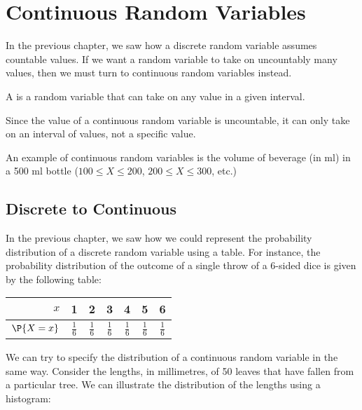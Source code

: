 \chapter{Continuous Random Variables}\label{chap:Continuous-Random-Variables}

In the previous chapter, we saw how a discrete random variable assumes countable values. If we want a random variable to take on uncountably many values, then we must turn to continuous random variables instead.

\begin{definition}\label{def:CRV}
    A  is a random variable that can take on any value in a given interval.
\end{definition}

Since the value of a continuous random variable is uncountable, it can only take on an interval of values, not a specific value.

An example of continuous random variables is the volume of beverage (in ml) in a 500 ml bottle ($100 \leq X \leq 200$, $200 \leq X \leq 300$, etc.)

\section{Discrete to Continuous}

In the previous chapter, we saw how we could represent the probability distribution of a discrete random variable using a table. For instance, the probability distribution of the outcome of a single throw of a 6-sided dice is given by the following table:

\begin{center}
    \begin{tabular}{|r|c|c|c|c|c|c|}
        \hline
        $x$ & 1 & 2 & 3 & 4 & 5 & 6 \\ \hline
        $\P{X = x}$ & $\frac16$ & $\frac16$ & $\frac16$ & $\frac16$ & $\frac16$ & $\frac16$ \\ \hline
    \end{tabular}
\end{center}

We can try to specify the distribution of a continuous random variable in the same way. Consider the lengths, in millimetres, of 50 leaves that have fallen from a particular tree. We can illustrate the distribution of the lengths using a histogram:

